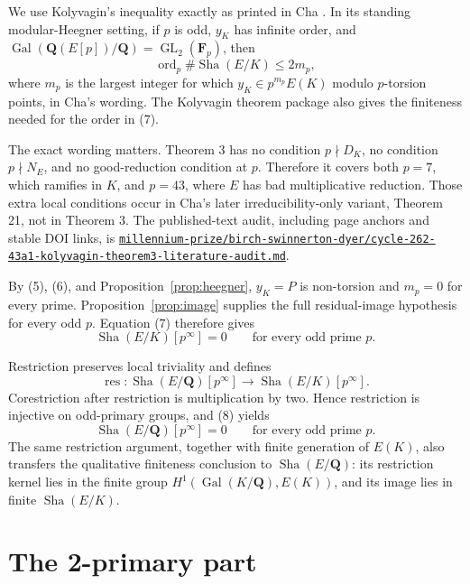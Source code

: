 \documentclass[11pt]{article}
\newcommand{\Q}{\mathbf Q}
\newcommand{\F}{\mathbf F}
\newcommand{\Gal}{\operatorname{Gal}}
\newcommand{\Sha}{\mathop{\mathrm{Sha}}}
\newcommand{\ord}{\operatorname{ord}}
\newcommand{\artifact}[1]{\href{run:../#1}{\nolinkurl{#1}}}
\begin{document}
We use Kolyvagin's inequality exactly as printed in Cha
\cite[Theorem 3, p.~155]{Cha}.  In its standing modular-Heegner setting, if
\(p\) is odd, \(y_K\) has infinite order, and
\(\Gal(\Q(E[p])/\Q)=\operatorname{GL}_2(\F_p)\), then
\begin{equation}
 \ord_p\#\Sha(E/K)\leq 2m_p,                            \tag{7}
\end{equation}
where \(m_p\) is the largest integer for which
\(y_K\in p^{m_p}E(K)\) modulo \(p\)-torsion points, in Cha's wording.  The
Kolyvagin theorem package also gives the finiteness needed for the order in
(7).

The exact wording matters.  Theorem 3 has no condition \(p\nmid D_K\), no
condition \(p\nmid N_E\), and no good-reduction condition at \(p\).  Therefore
it covers both \(p=7\), which ramifies in \(K\), and \(p=43\), where \(E\)
has bad multiplicative reduction.  Those extra local conditions occur in
Cha's later irreducibility-only variant, Theorem 21, not in Theorem 3.  The
published-text audit, including page anchors and stable DOI links, is
\artifact{millennium-prize/birch-swinnerton-dyer/cycle-262-43a1-kolyvagin-theorem3-literature-audit.md}.

By (5), (6), and Proposition~\ref{prop:heegner}, \(y_K=P\) is non-torsion and
\(m_p=0\) for every prime.  Proposition~\ref{prop:image} supplies the full
residual-image hypothesis for every odd \(p\).  Equation (7) therefore gives
\[
 \Sha(E/K)[p^\infty]=0
 \qquad\text{for every odd prime }p.                    \tag{8}
\]

Restriction preserves local triviality and defines
\[
 \operatorname{res}:\Sha(E/\Q)[p^\infty]
 \longrightarrow\Sha(E/K)[p^\infty].
\]
Corestriction after restriction is multiplication by two.  Hence restriction
is injective on odd-primary groups, and (8) yields
\begin{equation}
 \Sha(E/\Q)[p^\infty]=0
 \qquad\text{for every odd prime }p.                    \tag{9}
\end{equation}
The same restriction argument, together with finite generation of \(E(K)\),
also transfers the qualitative finiteness conclusion to \(\Sha(E/\Q)\): its
restriction kernel lies in the finite group \(H^1(\Gal(K/\Q),E(K))\), and its
image lies in finite \(\Sha(E/K)\).

\section{The 2-primary part}
\end{document}
